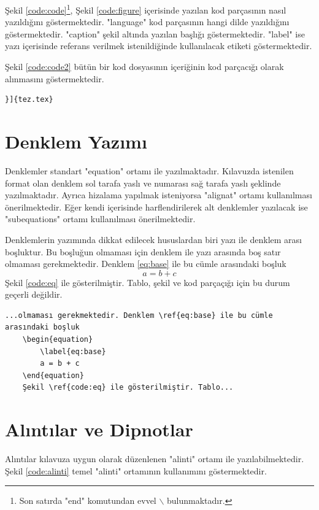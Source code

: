 Şekil \ref{code:code}\footnote{Son satırda "end" komutundan evvel $\backslash$ bulunmaktadır.}, Şekil \ref{code:figure} içerisinde yazılan kod parçasının nasıl yazıldığını göstermektedir. "language" kod parçasının hangi dilde yazıldığını göstermektedir. "caption" şekil altında yazılan başlığı göstermektedir. "label" ise yazı içerisinde referans verilmek istenildiğinde kullanılacak etiketi göstermektedir.

Şekil \ref{code:code2} bütün bir kod dosyasının içeriğinin kod parçacığı olarak alınmasını göstermektedir.
\begin{lstlisting}[language={[LaTeX]{TeX}}, label=code:code2, caption=tez.tex dosyasının içeriğinin yazılması]
}]{tez.tex}
\end{lstlisting}

\chapter{Denklem Yazımı}
Denklemler standart "equation" ortamı ile yazılmaktadır. Kılavuzda istenilen format olan denklem sol tarafa yaslı ve numarası sağ tarafa yaslı şeklinde yazılmaktadır. Ayrıca hizalama yapılmak isteniyorsa "alignat" ortamı kullanılması önerilmektedir. Eğer kendi içerisinde harflendirilerek alt denklemler yazılacak ise "subequations" ortamı kullanılması önerilmektedir. 

Denklemlerin yazımında dikkat edilecek hususlardan biri yazı ile denklem arası boşluktur. Bu boşluğun olmaması için denklem ile yazı arasında boş satır olmaması gerekmektedir. Denklem \ref{eq:base} ile bu cümle arasındaki boşluk
\begin{equation}
	\label{eq:base}
	a = b + c
\end{equation}
Şekil \ref{code:eq} ile gösterilmiştir. Tablo, şekil ve kod parçaçığı için bu durum geçerli değildir.

\begin{lstlisting}[language={[LaTeX]{TeX}}, label=code:eq, caption=Örnek denklem yazımı]
	...olmaması gerekmektedir. Denklem \ref{eq:base} ile bu cümle arasındaki boşluk
	\begin{equation}
		\label{eq:base}
		a = b + c
	\end{equation}
	Şekil \ref{code:eq} ile gösterilmiştir. Tablo...
\end{lstlisting}


\chapter{Alıntılar ve Dipnotlar}
Alıntılar kılavuza uygun olarak düzenlenen "alinti" ortamı ile yazılabilmektedir. Şekil \ref{code:alinti} temel "alinti" ortamının kullanımını göstermektedir.

